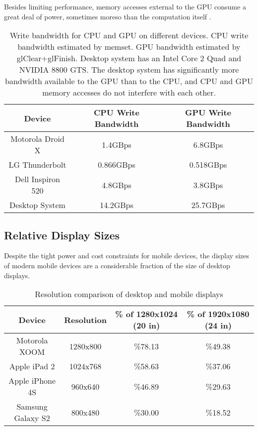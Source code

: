 Besides limiting performance, memory accesses external to the GPU consume a
great deal of power, sometimes moreso than the computation itself \cite{Antochi04}.

\begin{table}[htb]\centering \begin{tabular}{|c|c|c|} 
\hline \small{Device} & \small{CPU Write Bandwidth} & \small{GPU Write Bandwidth}   \\ \hline 
\hline \small{Motorola Droid X} & \small{1.4GBps} & \small{6.8GBps} \\ 
\hline \small{LG Thunderbolt} & \small{0.866GBps} & \small{0.518GBps} \\ 
\hline \small{Dell Inspiron 520} & \small{4.8GBps} & \small{3.8GBps} \\ 
\hline \small{Desktop System} & \small{14.2GBps} & \small{25.7GBps}\\
\hline
\end{tabular} 
\caption{Write bandwidth for CPU and GPU on different devices.  CPU write bandwidth estimated by memset.  GPU bandwidth estimated by glClear+glFinish.  Desktop system has an Intel Core 2 Quad and NVIDIA 8800 GTS.  The desktop system has significantly more bandwidth available to the GPU than to the CPU, and CPU and GPU memory accesses do not interfere with each other.}
\label{JonMcCaffrey:bandwidth} \end{table}

\subsection{Relative Display Sizes}\label{Jon-McCaffrey:relative-display-sizes}

 

Despite the tight power and cost constraints for mobile devices, the display
sizes of modern mobile devices are a considerable fraction of the size of
desktop displays.

\begin{table}[htb]\centering \begin{tabular}{|c|c|c|c|} 
\hline \small{Device} & \small{Resolution} & \small{\% of 1280x1024 (20 in)} & \small{\% of 1920x1080 (24 in)}  \\ \hline 
\small{Motorola XOOM} & \small{1280x800} & \small{\%78.13} & \small{\%49.38}\\ 
\hline \small{Apple iPad 2} & \small{1024x768} & \small{\%58.63} & \small{\%37.06}\\ 
\hline \small{Apple iPhone 4S} & \small{960x640} & \small{\%46.89} & \small{\%29.63}\\
\hline \small{Samsung Galaxy S2} & \small{800x480} & \small{\%30.00} & \small{\%18.52}\\ \hline
\end{tabular} 
\caption{Resolution comparison of desktop and mobile displays} 
\label{JonMcCaffrey:resolutions} \end{table}

